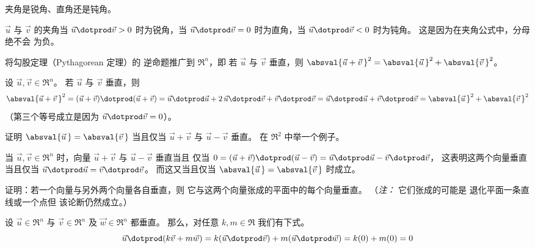     夹角是锐角、直角还是钝角。
     \begin{answer}
       \( \vec{u} \) 与 \( \vec{v} \) 的夹角当
       \( \vec{u}\dotprod\vec{v}> 0 \) 时为锐角，当
       \( \vec{u}\dotprod\vec{v}=0 \) 时为直角，当
       \( \vec{u}\dotprod\vec{v}<0 \) 时为钝角。
       这是因为在夹角公式中，分母绝不会
       为负。  
     \end{answer}
  \item 
    将勾股定理（Pythagorean 定理）的
    逆命题推广到 \( \Re^n \)，即
    若 \( \vec{u} \) 与 \( \vec{v} \)
    垂直，则
    \( \absval{\vec{u}+\vec{v}\,}^2=\absval{\vec{u}\,}^2+\absval{\vec{v}\,}^2 \)。
    \begin{answer}
      设 \( \vec{u},\vec{v}\in\Re^n \)。
      若 \( \vec{u} \) 与 \( \vec{v} \) 垂直，则
      \begin{equation*}
        \absval{\vec{u}+\vec{v}\,}^2
        =(\vec{u}+\vec{v})\dotprod(\vec{u}+\vec{v})    
        =\vec{u}\dotprod\vec{u}+2\,\vec{u}\dotprod\vec{v}
               +\vec{v}\dotprod\vec{v}  
        =\vec{u}\dotprod\vec{u}+\vec{v}\dotprod\vec{v}  
        =\absval{\vec{u}\,}^2+\absval{\vec{v}\,}^2
      \end{equation*}  
      （第三个等号成立是因为 \( \vec{u}\dotprod\vec{v}=0 \)）。
    \end{answer}
  \item 
    证明 \( \absval{\vec{u}\,}=\absval{\vec{v}\,} \)
    当且仅当 \( \vec{u}+\vec{v} \) 与
    \( \vec{u}-\vec{v} \) 垂直。
    在 \( \Re^2 \) 中举一个例子。
    \begin{answer}
      当 \( \vec{u},\vec{v}\in\Re^n \) 时，向量
      \( \vec{u}+\vec{v} \) 与 \( \vec{u}-\vec{v} \) 垂直当且
      仅当
      $0=(\vec{u}+\vec{v})\dotprod(\vec{u}-\vec{v})
         =\vec{u}\dotprod\vec{u}-\vec{v}\dotprod\vec{v}$，
      这表明这两个向量垂直当且仅当
      \( \vec{u}\dotprod\vec{u}=\vec{v}\dotprod\vec{v} \)。
      而这又当且仅当 \( \absval{\vec{u}\,}=\absval{\vec{v}\,} \) 时成立。  
   \end{answer}
  \item 
    证明：若一个向量与另外两个向量各自垂直，则
    它与这两个向量张成的平面中的每个向量垂直。
    （\textit{注：} 
    它们张成的可能是 
    退化平面\Dash 一条直线或一个点\Dash 但
    该论断仍然成立。）
    \begin{answer}
      设 \( \vec{u}\in\Re^n \) 与
      \( \vec{v}\in\Re^n \) 及 \( \vec{w}\in\Re^n \) 都垂直。
      那么，对任意 \( k,m\in\Re \) 我们有下式。
      \begin{equation*}
        \vec{u}\dotprod(k\vec{v}+m\vec{w})
        =k(\vec{u}\dotprod\vec{v})+m(\vec{u}\dotprod\vec{w})
        =k(0)+m(0)=0
      \end{equation*}  
    \end{answer}
